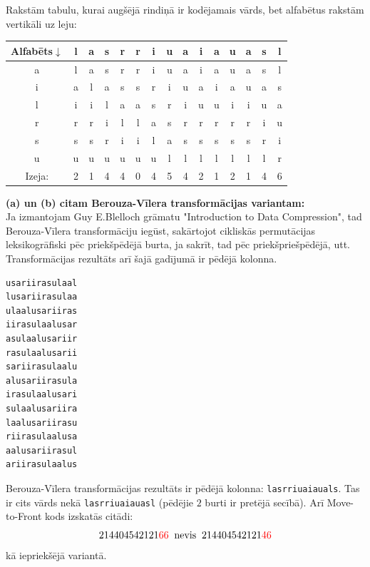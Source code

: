 \documentclass[11pt]{article}
\begin{document}
\noindent
Rakstām tabulu, kurai augšējā rindiņā ir kodējamais vārds, bet
alfabētus rakstām vertikāli uz leju:\\
\begin{tabular}{c|cccccccccccccc}
Alfabēts$\downarrow$ & l & a & s & r & r & i & u & a & i & a & u & a & s & l \\ \hline
a                    & l & a & s & r & r & i & u & a & i & a & u & a & s & l \\ 
i                    & a & l & a & s & s & r & i & u & a & i & a & u & a & s \\ 
l                    & i & i & l & a & a & s & r & i & u & u & i & i & u & a \\ 
r                    & r & r & i & l & l & a & s & r & r & r & r & r & i & u \\ 
s                    & s & s & r & i & i & l & a & s & s & s & s & s & r & i \\ 
u                    & u & u & u & u & u & u & l & l & l & l & l & l & l & r \\ \hline
Izeja:               & 2 & 1 & 4 & 4 & 0 & 4 & 5 & 4 & 2 & 1 & 2 & 1 & 4 & 6 
\end{tabular}


\noindent
{\bf (a) un (b) citam Berouza-Vīlera transformācijas variantam:}\\
Ja izmantojam Guy E.Blelloch grāmatu "Introduction to Data Compression", tad
Berouza-Vīlera transformāciju iegūst, sakārtojot cikliskās permutācijas
leksikogrāfiski pēc priekšpēdējā burta, ja sakrīt, tad pēc priekšpriešpēdējā, utt. 
Transformācijas rezultāts arī šajā gadījumā ir pēdējā kolonna. 

\begin{verbatim}
usariirasulaal
lusariirasulaa
ulaalusariiras
iirasulaalusar
asulaalusariir
rasulaalusarii
sariirasulaalu
alusariirasula
irasulaalusari
sulaalusariira
laalusariirasu
riirasulaalusa
aalusariirasul
ariirasulaalus
\end{verbatim}

Berouza-Vīlera transformācijas rezultāts ir pēdējā kolonna: {\tt lasrriuaiauals}. 
Tas ir cits vārds nekā {\tt lasrriuaiauasl} (pēdējie $2$ burti ir pretējā secībā). 
Arī Move-to-Front kods izskatās citādi: 
$$214404542121\textcolor{red}{66}\;\;\text{nevis}\;\;214404542121\textcolor{red}{46}$$
kā iepriekšējā variantā.
\end{document}
